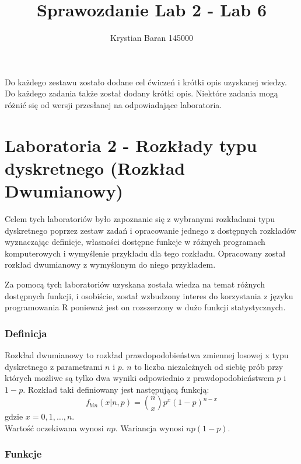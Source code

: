 \documentclass{article}
\author{Krystian Baran 145000}
\title{Sprawozdanie Lab 2 - Lab 6}
\begin{document}
\maketitle
\newpage

\tableofcontents
\newpage

{
\vspace*{\fill}
Do każdego zestawu zostało dodane cel ćwiczeń i krótki opis uzyskanej wiedzy. Do każdego zadania także został dodany krótki opis. Niektóre zadania mogą różnić się od wersji przesłanej na odpowiadające laboratoria.
\vspace*{\fill}
}

\newpage
\part{Laboratoria 2 - Rozkłady typu dyskretnego (Rozkład Dwumianowy)}

Celem tych laboratoriów było zapoznanie się z wybranymi rozkładami typu dyskretnego poprzez zestaw zadań i opracowanie jednego z dostępnych rozkładów
wyznaczając definicje, własności dostępne funkcje w różnych programach komputerowych i wymyślenie przykładu dla tego rozkładu.
Opracowany został rozkład dwumianowy z wymyślonym do niego przykładem. \\ \par
Za pomocą tych laboratoriów uzyskana została wiedza na temat różnych dostępnych funkcji, i osobiście, został wzbudzony interes do korzystania z języku programowania R ponieważ jest on rozszerzony w dużo funkcji statystycznych.

\section{Definicja}
\begin{flushleft}
Rozkład dwumianowy to rozkład prawdopodobieństwa zmiennej losowej x typu dyskretnego z parametrami $n$ i $p$. $n$ to liczba niezależnych od siebię prób przy których możliwe są tylko dwa wyniki odpowiednio z prawdopodobieństwem $p$ i $1-p$. Rozkład taki definiowany jest następującą funkcją:
$$f_{bin}(x|n,p) = \binom{n}{x}p^x(1-p)^{n-x}$$
gdzie $x = 0,1,\dots,n$. \\
Wartość oczekiwana wynosi $np$. Wariancja wynosi $np(1-p)$.
\end{flushleft}

\section{Funkcje}
\end{document}
